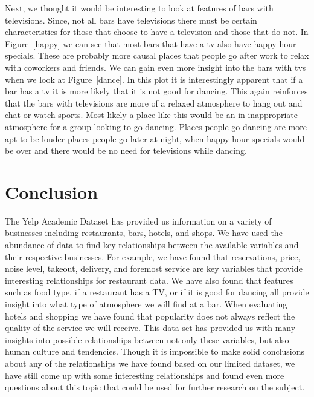 \documentclass[11pt]{article}
\begin{document}
Next, we thought it would be interesting to look at features of bars with televisions.  Since, not all bars have televisions there must be certain characteristics for those that choose to have a television and those that do not.   In  Figure~\ref{happy} we can see that most bars that have a tv also have happy hour specials.  These are probably more causal places that people go after work to relax with coworkers and friends.  We can gain even more insight into the bars with tvs when we look at  Figure~\ref{dance}.  In this plot it is interestingly apparent that if a bar has a tv it is more likely that it is not good for dancing.  This again reinforces that the bars with televisions are more of a relaxed atmosphere to hang out and chat or watch sports.  Most likely a place like this would be an in inappropriate atmosphere for a group looking to go dancing.  Places people go dancing are more apt to be louder places people go later at night, when happy hour specials would be over and there would be no need for televisions while dancing.  



\section{Conclusion}

The Yelp Academic Dataset has provided us information on a variety of businesses including restaurants, bars, hotels, and shops.  We have used the abundance of data to find key relationships between the available variables and their respective businesses.  For example, we have found that reservations, price, noise level, takeout, delivery, and foremost service are key variables that provide interesting relationships for restaurant data.  We have also found that features such as food type, if a restaurant has a TV, or if it is good for dancing all provide insight into what type of atmosphere we will find at a bar.  When evaluating hotels and shopping we have found that popularity does not always reflect the quality of the service we will receive.  This data set has provided us with many insights into possible relationships between not only these variables, but also human culture and tendencies.  Though it is impossible to make solid conclusions about any of the relationships we have found based on our limited dataset, we have still come up with some interesting relationships and found even more questions about this topic that could be used for further research on the subject.
\end{document}
